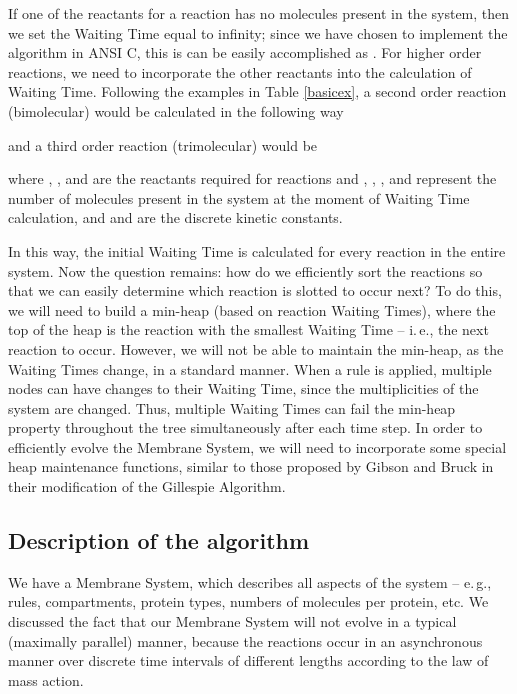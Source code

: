 \documentclass[copyright]{eptcs}
\newcommand{\noi}{\noindent}
\begin{document}
If one of the reactants for a reaction has no molecules present in the system, then we set the Waiting Time equal to infinity; since we have chosen to implement the algorithm in ANSI C, this is can be easily accomplished as .  For higher order reactions, we need to incorporate the other reactants into the calculation of Waiting Time.  Following the examples in Table \ref{basicex}, a second order reaction (bimolecular) would be calculated in the following way



\noi and a third order reaction (trimolecular) would be


\noi where , , and  are the reactants required for reactions  and , , , and  represent the number of molecules present in the system at the moment of Waiting Time calculation, and  and  are the discrete kinetic constants.

In this way, the initial Waiting Time is calculated for every reaction in the entire system.  Now the question remains: how do we efficiently sort the reactions so that we can easily determine which reaction is slotted to occur next?  To do this, we will need to build a min-heap (based on reaction Waiting Times), where the top of the heap is the reaction with the smallest Waiting Time -- i.\,e., the next reaction to occur.   However, we will not be able to maintain the min-heap, as the Waiting Times change, in a standard manner.   When a rule is applied, multiple nodes can have changes to their Waiting Time, since the multiplicities of the system are changed.  Thus, multiple Waiting Times can fail the min-heap property throughout the tree simultaneously after each time step.  In order to efficiently evolve the Membrane System, we will need to incorporate some special heap maintenance functions, similar to those proposed by Gibson and Bruck \cite{gibson00} in their modification of the Gillespie Algorithm.



\subsection{Description of the algorithm}\label{NWT}

We have a Membrane System, which describes all aspects of the system -- e.\,g., rules, compartments, protein types, numbers of molecules per protein, etc.  We discussed the fact that our Membrane System will not evolve in a typical (maximally parallel) manner, because the reactions occur in an asynchronous manner over discrete time intervals of different lengths according to the law of mass action.
\end{document}
